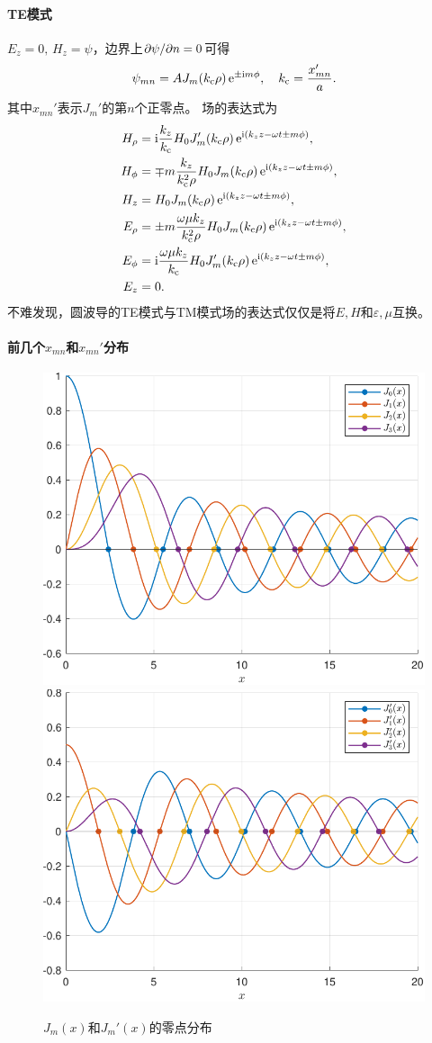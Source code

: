 \paragraph{TE模式}

$E_z=0,\,H_z=\psi$，边界上$\partial\psi/\partial n=0$可得
\begin{equation}
    \psi_{mn}=AJ_m(k_\text c\rho)\mathop{}\!\mathrm{e}^{\pm\mathrm{i} m\phi},\quad k_\text c=\frac{x_{mn}'}a.
\end{equation}
其中$x_{mn}'$表示$J_m'$的第$n$个正零点。
场的表达式为
\begin{subequations}
    \begin{align*}
        H_\rho&=\mathrm{i}\frac{k_z}{k_\text c}H_0J_m'(k_\text c\rho)\mathop{}\!\mathrm{e}^{\mathrm{i}(k_zz-\omega t\pm m\phi)},\\
        H_\phi&=\mp m\frac{k_z}{k_\text c^2\rho}H_0J_m(k_\text c\rho)\mathop{}\!\mathrm{e}^{\mathrm{i}(k_zz-\omega t\pm m\phi)},\\
        H_z&=H_0J_m(k_\text c\rho)\mathop{}\!\mathrm{e}^{\mathrm{i}(k_zz-\omega t\pm m\phi)},\\
        E_\rho&=\pm m\frac{\omega\mu k_z}{k_\text c^2\rho}H_0J_m(k_\text c\rho)\mathop{}\!\mathrm{e}^{\mathrm{i}(k_zz-\omega t\pm m\phi)},\\
        E_\phi&=\mathrm{i}\frac{\omega\mu k_z}{k_\text c}H_0J_m'(k_\text c\rho)\mathop{}\!\mathrm{e}^{\mathrm{i}(k_zz-\omega t\pm m\phi)},\\
        E_z&=0.
    \end{align*}
\end{subequations}
不难发现，圆波导的TE模式与TM模式场的表达式仅仅是将$E,H$和$\varepsilon,\mu$互换。

\paragraph{前几个$x_{mn}$和$x_{mn}'$分布}

\begin{figure}[H]
    \centering
        {\includegraphics[width=0.45\linewidth]{figures/BesselJzero.pdf}}
        {\includegraphics[width=0.45\linewidth]{figures/BesselJpzero.pdf}}
    \caption{$J_m(x)$和$J_m'(x)$的零点分布}
    \label{fig:Bessel function zeros}
\end{figure}

